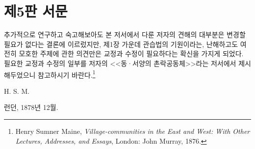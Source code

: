 \chapter{제5판 서문}

추가적으로 연구하고 숙고해보아도
본 저서에서 다룬 저자의 견해의 대부분은
변경할 필요가 없다는 결론에 이르렀지만,
제1장 가운데
관습법의 기원이라는, 난해하고도 여전히 모호한 주제에 관한 의견만은
교정과 수정이 필요하다는 확신을 가지게 되었다.
필요한 교정과 수정의 일부를
저자의
<<동^^b7서양의 촌락공동체>>라는
저서에서 제시해두었으니 참고하시기 바란다.\footnote{%
  \latinmarks
  Henry Sumner Maine,
  \textit{Village-communities in the East and West: With Other Lectures,
  Addresses, and Essays},
  London: John Murray, 1876. }

\begin{flushright}
H. S. M.
\end{flushright}

\begin{footnotesize}
런던, 1878년 12월.
\end{footnotesize}

